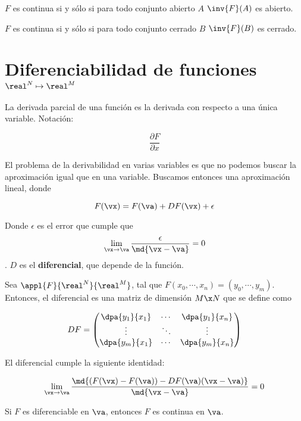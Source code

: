 \documentclass[12pt,a4paper,titlepage]{apuntes}
\begin{document}
\begin{theorem}
$F$ es continua si y sólo si para todo conjunto abierto $A$ $\inv{F}(A)$ es abierto.
\end{theorem}

\begin{theorem}
$F$ es continua si y sólo si para todo conjunto cerrado $B$ $\inv{F}(B)$ es cerrado.
\end{theorem}

\section{Diferenciabilidad de funciones $\real^N \mapsto \real^M$}

\begin{defn}
La derivada parcial de una función es la derivada con respecto a una única variable. Notación: 

\[ \frac{\partial F}{\partial x} \]
\end{defn}


El problema de la derivabilidad en varias variables es que no podemos buscar la aproximación igual que en una variable. Buscamos entonces una aproximación lineal, donde

\[ F(\vx) = F(\va) +DF(\vx) + \epsilon \]

Donde $\epsilon$ es el error que cumple que \[\lim_{\vx\to\va} \frac{\epsilon}{\md{\vx-\va}} =0\]. $D$ es el \textbf{diferencial}, que depende de la función.

\begin{defn}[Diferencial]
Sea $\appl{F}{\real^N}{\real^M}$, tal que $F(x_0,\cdots,x_n) = (y_0, \cdots, y_m)$. Entonces, el diferencial es una matriz de dimensión $M\x N$ que se define como

\[ DF = \left( \begin{matrix} \dpa{y_1}{x_1} & \cdots &\dpa{y_1}{x_n} \\
\vdots & \ddots & \vdots \\
\dpa{y_m}{x_1} & \cdots & \dpa{y_m}{x_n} \end{matrix}\right) \]

El diferencial cumple la siguiente identidad: 

\[ \lim_{\vx\to\va} \frac{\md{(F(\vx) - F(\va)) - DF(\va)(\vx-\va)}}{\md{\vx-\va}} = 0 \]
\end{defn}

\begin{theorem}
Si $F$ es diferenciable en $\va$, entonces $F$ es continua en $\va$.
\end{theorem}
\end{document}
